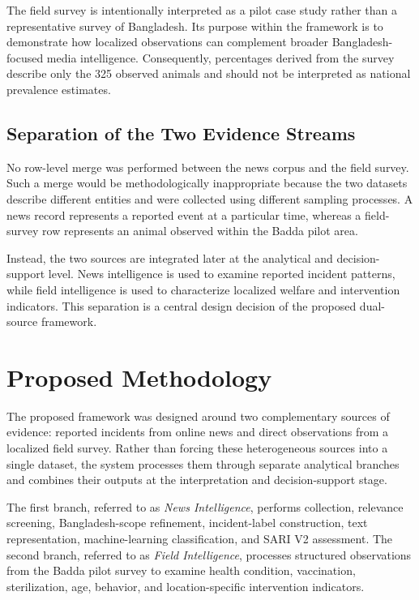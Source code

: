 \documentclass[conference]{IEEEtran}
\begin{document}
The field survey is intentionally interpreted as a pilot case study rather
than a representative survey of Bangladesh. Its purpose within the framework
is to demonstrate how localized observations can complement broader
Bangladesh-focused media intelligence. Consequently, percentages derived from
the survey describe only the 325 observed animals and should not be
interpreted as national prevalence estimates.

\subsection{Separation of the Two Evidence Streams}

No row-level merge was performed between the news corpus and the field survey.
Such a merge would be methodologically inappropriate because the two datasets
describe different entities and were collected using different sampling
processes. A news record represents a reported event at a particular time,
whereas a field-survey row represents an animal observed within the Badda
pilot area.

Instead, the two sources are integrated later at the analytical and
decision-support level. News intelligence is used to examine reported
incident patterns, while field intelligence is used to characterize
localized welfare and intervention indicators. This separation is a central
design decision of the proposed dual-source framework.



\section{Proposed Methodology}

The proposed framework was designed around two complementary sources of
evidence: reported incidents from online news and direct observations from a
localized field survey. Rather than forcing these heterogeneous sources into
a single dataset, the system processes them through separate analytical
branches and combines their outputs at the interpretation and
decision-support stage.

The first branch, referred to as \textit{News Intelligence}, performs
collection, relevance screening, Bangladesh-scope refinement, incident-label
construction, text representation, machine-learning classification, and
SARI V2 assessment. The second branch, referred to as
\textit{Field Intelligence}, processes structured observations from the
Badda pilot survey to examine health condition, vaccination, sterilization,
age, behavior, and location-specific intervention indicators.
\end{document}
